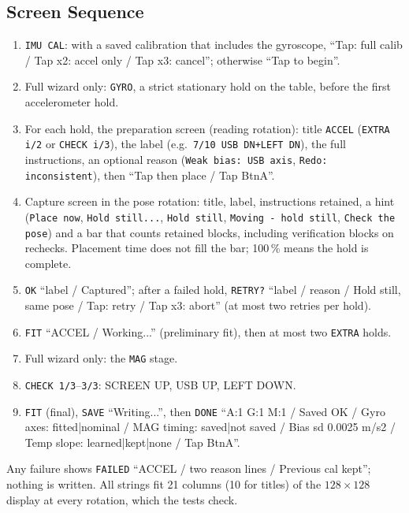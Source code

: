 \documentclass[conference]{IEEEtran}
\begin{document}
    \subsection{Screen Sequence}

    \begin{enumerate}
        \item \texttt{IMU CAL}: with a saved calibration that includes the
        gyroscope, ``Tap: full calib / Tap x2: accel only / Tap x3: cancel'';
        otherwise ``Tap to begin''.
        \item Full wizard only: \texttt{GYRO}, a strict stationary hold on
        the table, before the first accelerometer hold.
        \item For each hold, the preparation screen (reading rotation):
        title \texttt{ACCEL} (\texttt{EXTRA i/2} or \texttt{CHECK i/3}),
        the label (e.g.\ \texttt{7/10 USB DN+LEFT DN}), the full
        instructions, an optional reason (\texttt{Weak bias: USB axis},
        \texttt{Redo: inconsistent}), then ``Tap then place / Tap BtnA''.
        \item Capture screen in the pose rotation: title, label,
        instructions retained, a hint (\texttt{Place now}, \texttt{Hold
        still...}, \texttt{Hold still}, \texttt{Moving - hold still},
        \texttt{Check the pose}) and a bar that counts retained blocks,
        including verification blocks on rechecks. Placement time does not
        fill the bar; 100\,\% means the hold is complete.
        \item \texttt{OK} ``label / Captured''; after a failed hold,
        \texttt{RETRY?} ``label / reason / Hold still, same pose / Tap:
        retry / Tap x3: abort'' (at most two retries per hold).
        \item \texttt{FIT} ``ACCEL / Working...'' (preliminary fit), then
        at most two \texttt{EXTRA} holds.
        \item Full wizard only: the \texttt{MAG} stage.
        \item \texttt{CHECK 1/3}--\texttt{3/3}: SCREEN UP, USB UP, LEFT DOWN.
        \item \texttt{FIT} (final), \texttt{SAVE} ``Writing...'', then
        \texttt{DONE} ``A:1 G:1 M:1 / Saved OK / Gyro axes: fitted|nominal /
        MAG timing: saved|not saved / Bias sd 0.0025 m/s2 /
        Temp slope: learned|kept|none / Tap BtnA''.
    \end{enumerate}
    Any failure shows \texttt{FAILED} ``ACCEL / two reason lines /
    Previous cal kept''; nothing is written. All strings fit 21 columns (10
    for titles) of the $128\times128$ display at every rotation, which the
    tests check.
\end{document}
